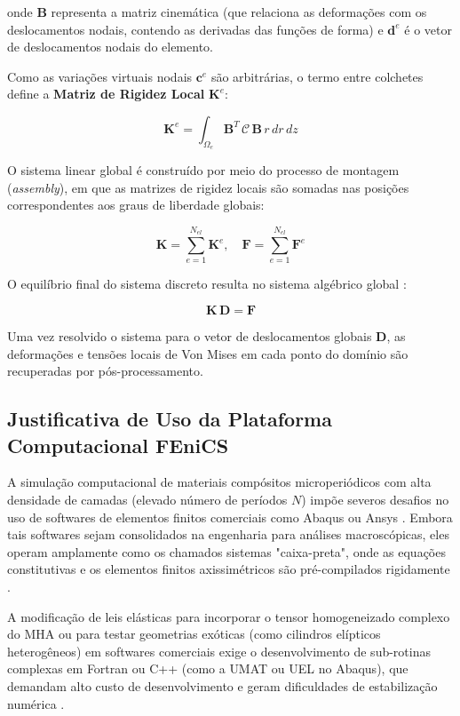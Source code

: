 onde $\mathbf{B}$ representa a matriz cinemática (que relaciona as deformações com os deslocamentos nodais, contendo as derivadas das funções de forma) e $\mathbf{d}^e$ é o vetor de deslocamentos nodais do elemento.

Como as variações virtuais nodais $\mathbf{c}^e$ são arbitrárias, o termo entre colchetes define a \textbf{Matriz de Rigidez Local} $\mathbf{K}^e$:

\begin{equation}
  \mathbf{K}^e = \int_{\Omega_e} \mathbf{B}^T \, \mathbf{\mathcal{C}} \, \mathbf{B} \, r \, dr \, dz
\end{equation}

O sistema linear global é construído por meio do processo de montagem (\textit{assembly}), em que as matrizes de rigidez locais são somadas nas posições correspondentes aos graus de liberdade globais:

\begin{equation}
  \mathbf{K} = \sum_{e=1}^{N_{el}} \mathbf{K}^e, \quad \mathbf{F} = \sum_{e=1}^{N_{el}} \mathbf{F}^e
\end{equation}

O equilíbrio final do sistema discreto resulta no sistema algébrico global \cite{logg2012automated}:

\begin{equation}
  \mathbf{K} \, \mathbf{D} = \mathbf{F}
\end{equation}

Uma vez resolvido o sistema para o vetor de deslocamentos globais $\mathbf{D}$, as deformações e tensões locais de Von Mises em cada ponto do domínio são recuperadas por pós-processamento.

\subsection{Justificativa de Uso da Plataforma Computacional FEniCS}

A simulação computacional de materiais compósitos microperiódicos com alta densidade de camadas (elevado número de períodos $N$) impõe severos desafios no uso de softwares de elementos finitos comerciais como Abaqus ou Ansys \cite{Sadd2009}. Embora tais softwares sejam consolidados na engenharia para análises macroscópicas, eles operam amplamente como os chamados sistemas "caixa-preta", onde as equações constitutivas e os elementos finitos axissimétricos são pré-compilados rigidamente \cite{Sadd2009}.

A modificação de leis elásticas para incorporar o tensor homogeneizado complexo do MHA ou para testar geometrias exóticas (como cilindros elípticos heterogêneos) em softwares comerciais exige o desenvolvimento de sub-rotinas complexas em Fortran ou C++ (como a UMAT ou UEL no Abaqus), que demandam alto custo de desenvolvimento e geram dificuldades de estabilização numérica \cite{logg2012automated}.

